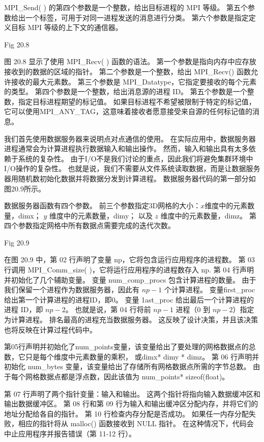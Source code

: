 MPI\_Send( ) 的第四个参数是一个整数，给出目标进程的 MPI 等级。 
第五个参数给出一个标签，可用于对同一进程发送的消息进行分类。 第六个参数是指定定义目标 MPI 等级的上下文的通信器。

{\color{red} Fig 20.8}

图 20.8 显示了使用 MPI\_Recv( ) 函数的语法。 第一个参数是指向内存中应存放接收到的数据的区域的指针。 
第二个参数是一个整数，给出 MPI\_Recv() 函数允许接收的最大元素数。 
第三个参数是 MPI\_Datatype，它指定要接收的每个元素的类型。 第四个参数是一个整数，给出消息源的进程 ID。 
第五个参数是一个整数，指定目标进程期望的标记值。 
如果目标进程不希望被限制于特定的标记值，它可以使用MPI\_ANY\_TAG，这意味着接收者愿意接受来自源的任何标记值的消息。

我们首先使用数据服务器来说明点对点通信的使用。 在实际应用中，数据服务器进程通常会为计算进程执行数据输入和输出操作。 
然而，输入和输出具有太多依赖于系统的复杂性。 由于I/O不是我们讨论的重点，因此我们将避免集群环境中I/O操作的复杂性。 
也就是说，我们不需要从文件系统读取数据，而是让数据服务器用随机数初始化数据并将数据分发到计算进程。 
数据服务器代码的第一部分如图20.9所示。

数据服务器函数有四个参数。 前三个参数指定3D网格的大小：$x$维度中的元素数量，dimx； $y$ 维度中的元素数量，dimy； 
以及 $z$ 维度中的元素数量，dimz。 第四个参数指定网格中所有数据点需要完成的迭代次数。

{\color{red} Fig 20.9}

在图 20.9 中，第 02 行声明了变量 np，它将包含运行应用程序的进程数。 
第 03 行调用 MPI\_Comm\_size( )，它将运行应用程序的进程数存入 np. 第 04 行声明并初始化了几个辅助变量。 
变量 num\_comp\_procs 包含计算进程的数量。 由于我们保留一个进程作为数据服务器，因此有 $n p-1$ 个计算进程。 
变量first\_proc给出第一个计算进程的进程ID，即0。 变量 1ast\_proc 给出最后一个计算进程的进程 ID，即 $n p-2$。 
也就是说，第 04 行将前 $n p-1$ 进程（0 到 $n p-2$）指定为计算进程。 排名最高的进程充当数据服务器。 
这反映了设计决策，并且该决策也将反映在计算过程代码中。

第05行声明并初始化了num\_points变量，该变量给出了要处理的网格数据点的总数，它只是每个维度中元素数量的乘积，
或dimx* dimy * dimz。 第 06 行声明并初始化 num\_bytes 变量，该变量给出了存储所有网格数据点所需的字节总数。 
由于每个网格数据点都是浮点数，因此该值为 num\_points* sizeof(float)。

第 07 行声明了两个指针变量：输入和输出。 这两个指针将指向输入数据缓冲区和输出数据缓冲区。 
第 08 行和第 09 行为输入和输出缓冲区分配内存，并将它们的地址分配给各自的指针。 第 10 行检查内存分配是否成功。 
如果任一内存分配失败，相应的指针将从 malloc() 函数接收到 NULL 指针。 
在这种情况下，代码会中止应用程序并报告错误（第 11-12 行）。

